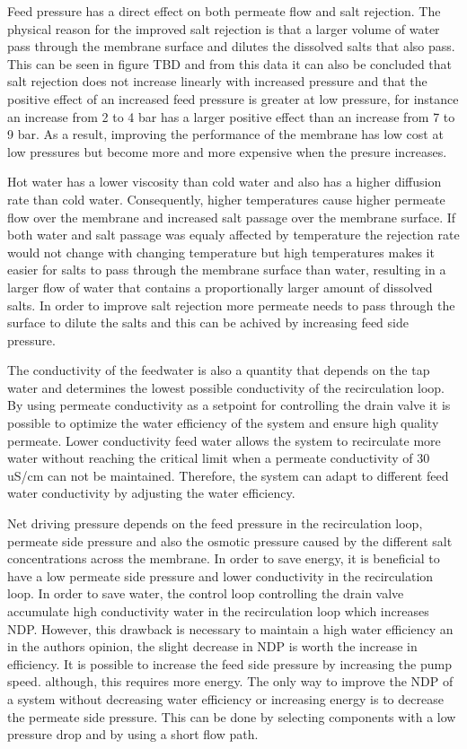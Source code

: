 Feed pressure has a direct effect on both permeate flow and salt rejection. The physical reason for the improved salt rejection is that a larger volume of water pass through the membrane surface and dilutes the dissolved salts that also pass. This can be seen in figure TBD and from this data it can also be concluded that salt rejection does not increase linearly with increased pressure and that the positive effect of an increased feed pressure is greater at low pressure, for instance an increase from 2 to 4 bar has a larger positive effect than an increase from 7 to 9 bar. As a result, improving the performance of the membrane has low cost at low pressures but become more and more expensive when the presure increases.

Hot water has a lower viscosity than cold water and also has a higher diffusion rate than cold water. Consequently, higher temperatures cause higher permeate flow over the membrane and increased salt passage over the membrane surface. If both water and salt passage was equaly affected by temperature the rejection rate would not change with changing temperature but high temperatures makes it easier for salts to pass through the membrane surface than water, resulting in a larger flow of water  that contains a proportionally larger amount of dissolved salts. In order to improve salt rejection more permeate needs to pass through the surface to dilute the salts and this can be achived by increasing feed side pressure. 

The conductivity of the feedwater is also a quantity that depends on the tap water and determines the lowest possible conductivity of the recirculation loop. By using permeate conductivity as a setpoint for controlling the drain valve it is possible to optimize the water efficiency of the system and ensure high quality permeate. Lower conductivity feed water allows the system to recirculate more water without reaching the critical limit when a permeate conductivity of 30 uS/cm can not be maintained. Therefore, the system can adapt to different feed water conductivity by adjusting the water efficiency.

Net driving pressure depends on the feed pressure in the recirculation loop, permeate side pressure and also the osmotic pressure caused by the different salt concentrations across the membrane. In order to save energy, it is beneficial to have a low permeate side pressure and lower conductivity in the recirculation loop. In order to save water, the control loop controlling the drain valve accumulate high conductivity water in the recirculation loop which increases NDP. However, this drawback is necessary to maintain a high water efficiency an in the authors opinion, the slight decrease in NDP is worth the increase in efficiency. It is possible to increase the feed side pressure by increasing the pump speed. although, this requires more energy. The only way to improve the NDP of a system without decreasing water efficiency or increasing energy is to decrease the permeate side pressure. This can be done by selecting components with a low pressure drop and by using a short flow path.

